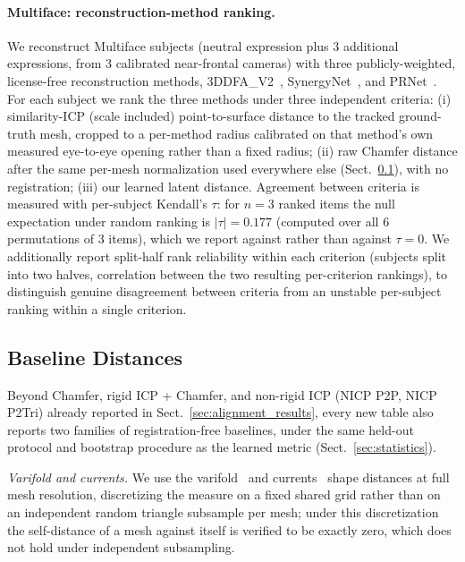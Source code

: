 \documentclass[10pt,twocolumn,letterpaper]{article}
\begin{document}
\paragraph{Multiface: reconstruction-method ranking.}
We reconstruct Multiface subjects (neutral expression plus 3 additional expressions, from 3 calibrated near-frontal cameras) with three publicly-weighted, license-free reconstruction methods, 3DDFA\_V2~\cite{3ddfav2}, SynergyNet~\cite{synergynet}, and PRNet~\cite{prnet}. For each subject we rank the three methods under three independent criteria: (i) similarity-ICP (scale included) point-to-surface distance to the tracked ground-truth mesh, cropped to a per-method radius calibrated on that method's own measured eye-to-eye opening rather than a fixed radius; (ii) raw Chamfer distance after the same per-mesh normalization used everywhere else (Sect.~\ref{sec:baseline_protocol}), with no registration; (iii) our learned latent distance. Agreement between criteria is measured with per-subject Kendall's $\tau$: for $n=3$ ranked items the null expectation under random ranking is $|\tau|=0.177$ (computed over all 6 permutations of 3 items), which we report against rather than against $\tau=0$. We additionally report split-half rank reliability within each criterion (subjects split into two halves, correlation between the two resulting per-criterion rankings), to distinguish genuine disagreement between criteria from an unstable per-subject ranking within a single criterion.

\subsection{Baseline Distances}
\label{sec:baseline_protocol}
Beyond Chamfer, rigid ICP + Chamfer, and non-rigid ICP (NICP P2P, NICP P2Tri) already reported in Sect.~\ref{sec:alignment_results}, every new table also reports two families of registration-free baselines, under the same held-out protocol and bootstrap procedure as the learned metric (Sect.~\ref{sec:statistics}).

\emph{Varifold and currents.} We use the varifold~\cite{kaltenmark2017general} and currents~\cite{vaillant2005surface} shape distances at full mesh resolution, discretizing the measure on a fixed shared grid rather than on an independent random triangle subsample per mesh; under this discretization the self-distance of a mesh against itself is verified to be exactly zero, which does not hold under independent subsampling.
\end{document}
